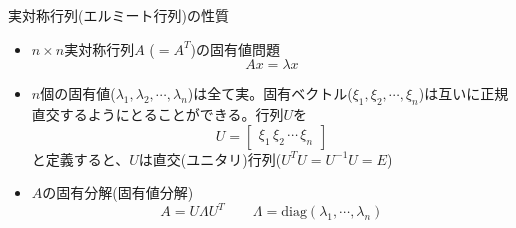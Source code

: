 \begin{frame}[t,fragile]{実対称行列(エルミート行列)の性質}
  \begin{itemize}
  \item $n \times n$実対称行列$A$ ($=A^T$)の固有値問題
    \[
    A x = \lambda x
    \]
  \item $n$個の固有値($\lambda_1,\lambda_2,\cdots,\lambda_n$)は全て実。固有ベクトル($\xi_1,\xi_2,\cdots,\xi_n$)は互いに正規直交するようにとることができる。行列$U$を
    \[
    U = \begin{bmatrix} \xi_1 \, \xi_2 \, \cdots \, \xi_n \end{bmatrix}
    \]
    と定義すると、$U$は直交(ユニタリ)行列($U^T U = U^{-1} U = E$)
  \item $A$の固有分解(固有値分解)
    \[
    A = U \Lambda U^T \qquad \Lambda = \text{diag}(\lambda_1,\cdots,\lambda_n)
    \]
  \end{itemize}
\end{frame}

